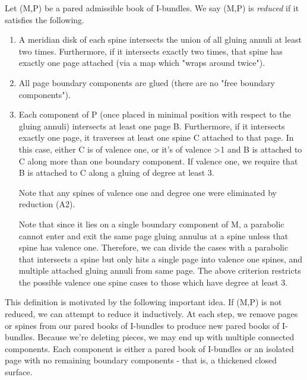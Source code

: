 \begin{defn}

Let (M,P) be a pared admissible book of I-bundles. We say (M,P) is
\emph{reduced} if it satisfies the following.

\begin{enumerate}

\item A meridian disk of each spine intersects the union of all gluing annuli
at least two times. Furthermore, if it intersects exactly two times, that spine
has exactly one page attached (via a map which "wraps around twice").

\item All page boundary components are glued (there are no "free boundary
components").

\item Each component of P (once placed in minimal position with respect to the
gluing annuli) intersects at least one page B. Furthermore, if it intersects
exactly one page, it traverses at least one spine C attached to that page. In
this case, either C is of valence one, or it's of valence >1 and B is attached
to C along more than one boundary component. If valence one, we require that
B is attached to C along a gluing of degree at least 3.

Note that any spines of valence one and degree one were eliminated by reduction
(A2).

Note that since it lies on a single boundary component of M, a parabolic cannot
enter and exit the same page gluing annulus at a spine unless that spine has
valence one. Therefore, we can divide the cases with a parabolic that
intersects a spine but only hits a single page into valence one spines, and
multiple attached gluing annuli from same page. The above criterion restricts
the possible valence one spine cases to those which have degree at least 3.

\end{enumerate}

\end{defn}

This definition is motivated by the following important idea. If (M,P) is not
reduced, we can attempt to reduce it inductively. At each step, we remove pages
or spines from our pared books of I-bundles to produce new pared books of
I-bundles.  Because we're deleting pieces, we may end up with multiple
connected components. Each component is either a pared book of I-bundles or an
isolated page with no remaining boundary components - that is, a thickened
closed surface.

